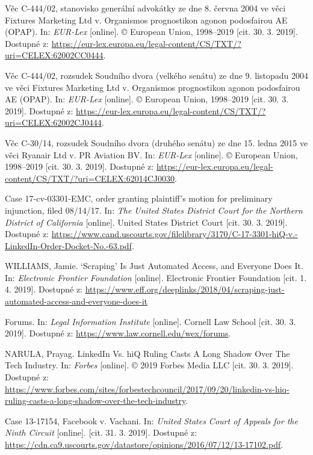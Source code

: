 \documentclass[thesis=B,czech]{FITthesis}[2012/06/26]
\begin{document}
\begin{thebibliography}{99}
	Věc C-444/02, stanovisko generální advokátky ze dne 8. června 2004 ve věci Fixtures Marketing Ltd v. Organismos prognostikon agonon podosfairou AE (OPAP). In: \textit{EUR-Lex} [online]. © European Union, 1998--2019 [cit. 30. 3. 2019]. Dostupné z: \url{https://eur-lex.europa.eu/legal-content/CS/TXT/?uri=CELEX:62002CC0444}.
	
	Věc C-444/02, rozsudek Soudního dvora (velkého senátu) ze dne 9. listopadu 2004 ve věci Fixtures Marketing Ltd v. Organismos prognostikon agonon podosfairou AE (OPAP). In: \textit{EUR-Lex} [online]. © European Union, 1998--2019 [cit. 30. 3. 2019]. Dostupné z: \url{https://eur-lex.europa.eu/legal-content/CS/TXT/?uri=CELEX:62002CJ0444}.
	
	Věc C-30/14, rozsudek Soudního dvora (druhého senátu) ze dne 15. ledna 2015 ve věci Ryanair Ltd v. PR Aviation BV. In: \textit{EUR-Lex} [online]. © European Union, 1998--2019 [cit. 30. 3. 2019]. Dostupné z: \url{https://eur-lex.europa.eu/legal-content/CS/TXT/?uri=CELEX:62014CJ0030}.
	
	Case 17-cv-03301-EMC, order granting plaintiff's motion for preliminary injunction, filed 08/14/17. In: \textit{The United States District Court for the Northern District of California} [online]. United States District Court [cit. 30. 3. 2019]. Dostupné z: \url{https://www.cand.uscourts.gov/filelibrary/3170/C-17-3301-hiQ-v.-LinkedIn-Order-Docket-No.-63.pdf}.
	
	WILLIAMS, Jamie. ‘Scraping’ Is Just Automated Access, and Everyone Does It. In: \textit{Electronic Frontier Foundation} [online]. Electronic Frontier Foundation [cit. 1. 4. 2019]. Dostupné z: \url{https://www.eff.org/deeplinks/2018/04/scraping-just-automated-access-and-everyone-does-it}
	
	Forums. In: \textit{Legal Information Institute} [online]. Cornell Law School [cit. 30. 3. 2019]. Dostupné z: \url{https://www.law.cornell.edu/wex/forums}.
	
	NARULA, Prayag. LinkedIn Vs. hiQ Ruling Casts A Long Shadow Over The Tech Industry. In: \textit{Forbes} [online]. © 2019 Forbes Media LLC [cit. 30. 3. 2019]. Dostupné z: \url{https://www.forbes.com/sites/forbestechcouncil/2017/09/20/linkedin-vs-hiq-ruling-casts-a-long-shadow-over-the-tech-industry}.
	
	Case 13-17154, Facebook v. Vachani. In: \textit{United States Court of Appeals for the Ninth Circuit} [online]. [cit. 31. 3. 2019]. Dostupné z: \url{https://cdn.ca9.uscourts.gov/datastore/opinions/2016/07/12/13-17102.pdf}.
	

\end{thebibliography}
\end{document}
